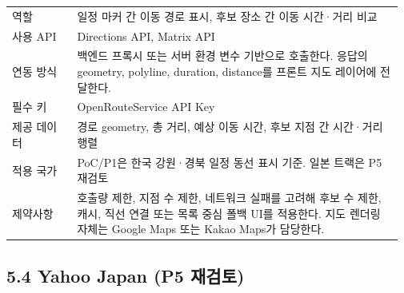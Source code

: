 \documentclass[12pt,a4paper]{article}
\newcommand{\DocNeedspace}[1]{\par\ifdim\dimexpr\pagegoal-\pagetotal\relax<#1\newpage\fi}
\renewcommand{\arraystretch}{1.35}
\begin{document}
\DocNeedspace{20\baselineskip}
\begin{small}
\setlength{\tabcolsep}{3pt}
\setlength{\extrarowheight}{1pt}
\renewcommand{\arraystretch}{1.42}
\begin{longtable}{@{}>{\centering\arraybackslash}m{0.165\linewidth}>{\RaggedRight\arraybackslash}m{0.807\linewidth}@{}}
\toprule
\multicolumn{1}{>{\centering\arraybackslash}m{0.165\linewidth}}{\textbf{항목}} & \multicolumn{1}{>{\centering\arraybackslash}m{0.807\linewidth}}{\textbf{내용}} \\
\midrule
\endhead
역할 & 일정 마커 간 이동 경로 표시, 후보 장소 간 이동 시간·거리 비교 \\
사용 API & Directions API, Matrix API \\
연동 방식 & 백엔드 프록시 또는 서버 환경 변수 기반으로 호출한다. 응답의 geometry, polyline, duration, distance를 프론트 지도 레이어에 전달한다. \\
필수 키 & OpenRouteService API Key \\
제공 데이터 & 경로 geometry, 총 거리, 예상 이동 시간, 후보 지점 간 시간·거리 행렬 \\
적용 국가 & PoC/P1은 한국 강원·경북 일정 동선 표시 기준. 일본 트랙은 P5 재검토 \\
제약사항 & 호출량 제한, 지점 수 제한, 네트워크 실패를 고려해 후보 수 제한, 캐시, 직선 연결 또는 목록 중심 폴백 UI를 적용한다. 지도 렌더링 자체는 Google Maps 또는 Kakao Maps가 담당한다. \\
\bottomrule
\end{longtable}
\end{small}


\DocNeedspace{24\baselineskip}
\subsection*{5.4 Yahoo Japan (P5 재검토)}
\end{document}
